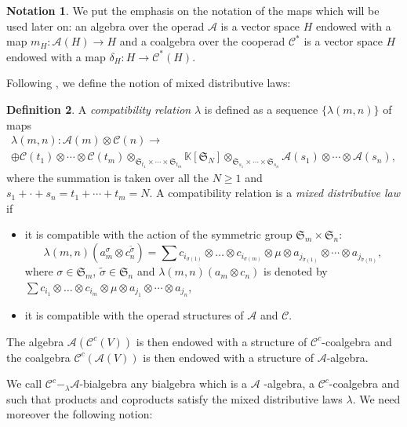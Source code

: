 \documentclass[11pt,leqno]{amsart}
\theoremstyle{definition}
\newtheorem{definition}{Definition}[subsection]
\newtheorem{notation}[definition]{Notation}
\theoremstyle{plain}
\newcommand{\A}{ \mathcal{A} }
\newcommand{\C}{ \mathcal{C} }
\begin{document}
\begin{notation}\label{notation}
We put the emphasis on the notation of the maps which will be used later on: an algebra over the operad $\A$ is a vector space $H$ endowed with a map $m_H : \A(H) \rightarrow H$ and a coalgebra over the cooperad $\C^*$ is a vector space $H$ endowed with a map $\delta_H : H \rightarrow \C^*(H)$. 
\end{notation}


Following \cite{Markl-Fox}, we define the notion of mixed distributive laws: 
\begin{definition}  \label{ml} 
A \emph{compatibility relation}  $\lambda$ is defined as a sequence $\{\lambda(m,n)\}$ of maps
\begin{multline*}
\lambda(m,n): \A(m)\otimes \C(n) \to \\ \oplus \C(t_1)\otimes\cdots\otimes \C(t_m)\otimes_{ \mathfrak{S}_{t_1}\times\cdots\times \mathfrak{S}_{t_m}} \mathbb K[\mathfrak{S}_N]\otimes_{\mathfrak{S}_{s_1}\times \cdots \times \mathfrak{S}_{s_n}} \A(s_1)\otimes \cdots\otimes \mathcal{A}(s_n),
\end{multline*}
where the summation is taken over all the $N\geq 1$ and $s_1+\cdot+s_n=t_1+\cdots+t_m=N$.
A compatibility relation is a \emph{mixed distributive law} if 
\begin{itemize}
\item it is compatible with the action of the symmetric group $\mathfrak{S}_m \times \mathfrak{S}_n$: 
\begin{equation*}
\lambda(m,n)(a_m^\sigma \otimes c^{\widetilde{\sigma}}_n) = \sum  c_{i_{\sigma(1)}} \otimes \ldots \otimes c_{i_{\sigma(m)}} \otimes \mu \otimes a_{j_{\tilde{\sigma}(1)}} \otimes \cdots \otimes a_{j_{\tilde{\sigma}(n)}},
\end{equation*}
where $\sigma \in \mathfrak{S}_m$, $\widetilde{\sigma} \in \mathfrak{S}_n$ and $\lambda(m,n)(a_m \otimes c_n)$ is denoted by $\sum  c_{i_1} \otimes \ldots \otimes c_{i_m} \otimes \mu \otimes a_{j_1} \otimes \cdots \otimes a_{j_n}$,
\item it is compatible with the operad structures of $\A$ and $\C$.
\end{itemize}
 The algebra $\mathcal{A}(\mathcal{C}^c(V))$ is then endowed with a structure of $\mathcal{C}^c$-coalgebra and the coalgebra $\mathcal{C}^c(\mathcal{A}(V))$ is then endowed with a structure of $\mathcal{A}$-algebra.
\end{definition}


We call $\C^c-_{\lambda}\A$-bialgebra any bialgebra which is a $\A$ -algebra, a $\C^c$-coalgebra and such that products and coproducts satisfy the mixed distributive laws $\lambda$. We need moreover the following notion:
\end{document}
